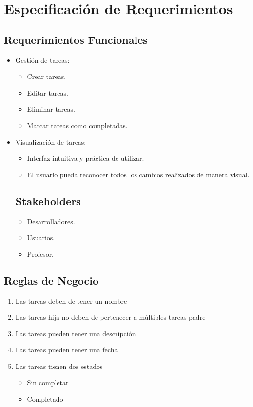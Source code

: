 \chapter{Especificación de Requerimientos}
\section{Requerimientos Funcionales}
\begin{itemize}
  \item Gestión de tareas:
    \begin{itemize}
      \item Crear tareas.
      \item Editar tareas.
      \item Eliminar tareas.
      \item Marcar tareas como completadas.
    \end{itemize}
  \item Visualización de tareas:
    \begin{itemize}
      \item Interfaz intuitiva y práctica de utilizar.
      \item El usuario pueda reconocer todos los cambios realizados de manera visual.
    \end{itemize}
    \section{Stakeholders}
    \begin{itemize}
        \item Desarrolladores.
        \item Usuarios.
        \item Profesor.
    \end{itemize}
\end{itemize}
\section{Reglas de Negocio}
\begin{enumerate}[start=1, label={RN\arabic*.}]
  \item Las tareas deben de tener un nombre
  \item Las tareas hija no deben de pertenecer a m\'ultiples tareas padre
  \item Las tareas pueden tener una descripci\'on
  \item Las tareas pueden tener una fecha
  \item Las tareas tienen dos estados
  \begin{itemize}
  \item Sin completar
    \item Completado
  \end{itemize}
\end{enumerate}

